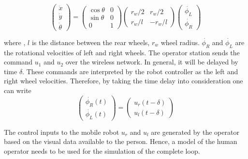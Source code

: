 \begin{equation}
\label{eqn:KinematicModelOfRobot}
\begin{pmatrix}
\dot{x}\\ 
\dot{y}\\ 
\dot{\theta}
\end{pmatrix}
=
\begin{pmatrix}
\cos \theta & 0 \\
\sin \theta & 0 \\
0& 1
\end{pmatrix}
\begin{pmatrix}
r_w/2 & r_w/2\\
r_w/ l & -r_w/l
\end{pmatrix}
\begin{pmatrix}
\dot{\phi_L}\\
\dot{\phi_R}
\end{pmatrix}
\end{equation}


where ,  $l$ is the distance between the rear wheels, $r_w$ wheel radius. $\dot{\phi_R}$ and $\dot{\phi_L} $ are the rotational velocities of left and right wheels. 
The operator station sends the command $u_1$ and $u_2$ over the wireless network. In general, it will be delayed by time $\delta$. These commands are interpreted by the robot controller as the left and right wheel velocities.  Therefore, by taking the time delay into consideration one can write
\begin{equation}
\begin{pmatrix}
\dot{\phi_R}(t) \\
 \dot{\phi_L}(t)
\end{pmatrix}
=
\begin{pmatrix}
u_r(t-\delta)\\
u_l(t-\delta)
\end{pmatrix}
\end{equation}

The control inputs to the mobile robot  $u_r$ and $u_l$ are generated by the operator based on the visual data available to the person. Hence, a model of the human operator needs to be used for the simulation of the complete loop.


